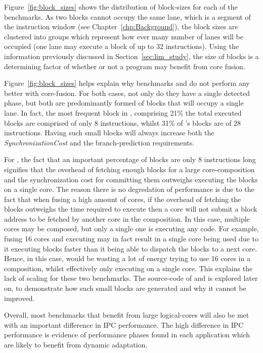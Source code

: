 Figure~\ref{fig:block_sizes} shows the distribution of block-sizes for each of the benchmarks.
As two blocks cannot occupy the same lane, which is a segment of the instruction window (see Chapter~\ref{chp:Background}), the block sizes are clustered into groups which represent how ever many number of lanes will be occupied (one lane may execute a block of up to 32 instructions).
Using the information previously discussed in Section~\ref{sec:lim_study}, the size of blocks is a determining factor of whether or not a program may benefit from core fusion.

Figure~\ref{fig:block_sizes} helps explain why benchmarks  and  do not perform any better with core-fusion.
For both cases, not only do they have a single detected phase, but both are predominantly formed of blocks that will occupy a single lane.
In fact, the most frequent block in , comprising 21\% the total executed blocks are comprised of only 8 instructions, whilst 31\% of 's blocks are of 28 instructions.
Having such small blocks will always increase both the \textit{SynchronizationCost} and the branch-prediction requirements.

For , the fact that an important percentage of blocks are only 8 instructions long signifies that the overhead of fetching enough blocks for a large core-composition and the synchronization cost for committing them outweighs executing the blocks on a single core.
The reason there is no degredation of performance is due to the fact that when fusing a high amount of cores, if the overhead of fetching the blocks outweighs the time required to execute then a core will not submit a block address to be fetched by another core in the composition.
In this case, multiple cores may be composed, but only a single one is executing any code.
For example, fusing 16 cores and executing  may in fact result in a single core being used due to it executing blocks faster than it being able to dispatch the blocks to a next core.
Hence, in this case,  would be wasting a lot of energy trying to use 16 cores in a composition, whilst effectively only executing on a single core. 
This explains the lack of scaling for these two benchmarks.
The source-code of  and  is explored later on, to demonstrate how such small blocks are generated and why it cannot be improved.

Overall, most benchmarks that benefit from large logical-cores will also be met with an important difference in IPC performance.
The high difference in IPC performance is evidence of performance phases found in each application which are likely to benefit from dynamic adaptation.

